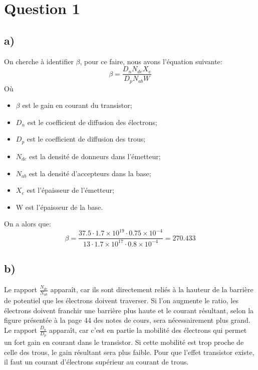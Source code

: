 



\label{s:experimentation}
\chapter*{Question 1}
\section*{a)}

On cherche à identifier $\beta$, pour ce faire, nous avons l'équation suivante:
\begin{equation}
\beta = \frac{D_n N_{de} X_e}{D_p N_{ab}W}
\end{equation}
Où
\begin{itemize}
\item $\beta$ est le gain en courant du transistor;
\item $D_n$ est le coefficient de diffusion des électrons;
\item $D_p$ est le coefficient de diffusion des trous;
\item $N_{de}$ est la densité de donneurs dans l'émetteur;
\item $N_{ab}$ est la densité d'accepteurs dans la base;
\item $X_e$ est l'épaisseur de l'émetteur;
\item W est l'épaisseur de la base.
\end{itemize}

On a alors que:
\begin{equation}
\beta = \frac{37.5\cdot 1.7\times 10^{19}\cdot 0.75\times 10^{-4}}{13 \cdot 1.7\times 10^{17} \cdot 0.8\times 10^{-4}} =270.433
\end{equation}

\section*{b)}
Le rapport $\frac{N_{de}}{N_{ab}}$ apparaît, car ils sont directement reliés à la hauteur de la  barrière de potentiel que les électrons doivent traverser. Si l’on augmente le ratio, les électrons doivent franchir une barrière plus haute et le courant résultant, selon la figure présentée à la page 44 des notes de cours, sera nécessairement plus grand. Le rapport $\frac{D_n}{D_p}$ apparaît, car c'est en partie la mobilité des électrons qui permet un fort gain en courant dans le transistor. Si cette mobilité est trop proche de celle des trous, le gain résultant sera plus faible. Pour que l'effet transistor existe, il faut un courant d'électrons supérieur au courant de trous.

